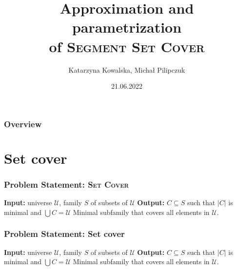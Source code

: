 \documentclass{beamer}
\title[Segment Set Cover]{Approximation and parametrization\\
of \textsc{Segment Set Cover}}
\author{Katarzyna Kowalska, Michał Pilipczuk} %
\institute[UW] %
{
University of Warsaw, MIMUW \\ %
\medskip
\textit{kk371053@students.mimuw.edu.pl} %
}
\date{21.06.2022} %
\begin{document}
\begin{frame}
\titlepage %
\end{frame}

\begin{frame}
\frametitle{Overview} %
\tableofcontents %
\end{frame}



\section{Set cover}
\begin{frame}
\frametitle{Problem Statement: \textsc{Set Cover}}
\textbf{Input:} universe $\mathcal{U}$,
family $S$ of subsets of $\mathcal{U}$
\newline
\textbf{Output:} $C \subseteq S$ such that $|C|$ is minimal and
$\bigcup C = \mathcal{U}$
\newline
Minimal subfamily that covers all elements in $\mathcal{U}$.



\end{frame}

\begin{frame}
\frametitle{Problem Statement: Set cover}
\textbf{Input:} universe $\mathcal{U}$,
family $S$ of subsets of $\mathcal{U}$
\newline
\textbf{Output:} $C \subseteq S$ such that $|C|$ is minimal and
$\bigcup C = \mathcal{U}$
\newline
Minimal subfamily that covers all elements in $\mathcal{U}$.



\end{frame}
\end{document}
